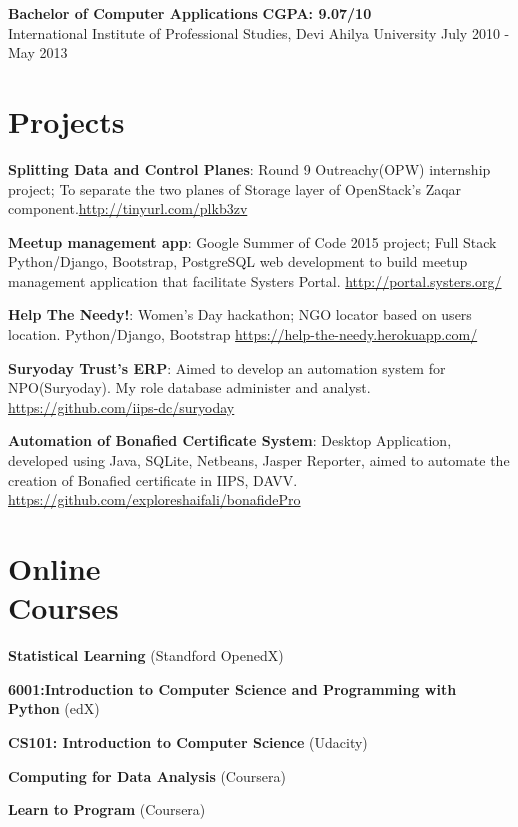 \documentclass[margin,line]{resume}
\begin{document}
\begin{resume}
	\begin{list2}
	\item \textbf{Bachelor of Computer Applications} \hspace{70mm} \textbf{CGPA: 9.07/10} \\ International Institute of Professional Studies, Devi Ahilya University \hspace{20mm} July 2010 - May 2013
	\end{list2}

    \section{\mysidestyle Projects} 
	\begin{list2}

    \item \textbf{Splitting Data and Control Planes}: Round 9 Outreachy(OPW) internship project; To separate the two planes of Storage layer of OpenStack's Zaqar component.\url{http://tinyurl.com/plkb3zv}
    \item \textbf{Meetup management app}: Google Summer of Code 2015 project; Full Stack Python/Django, Bootstrap, PostgreSQL web development to build meetup management application that facilitate Systers Portal. \url{http://portal.systers.org/}	
    \item \textbf{Help The Needy!}: Women's Day hackathon; NGO locator based on users location. Python/Django, Bootstrap \url{https://help-the-needy.herokuapp.com/}
	\item \textbf{Suryoday Trust's ERP}: Aimed to develop an automation system for NPO(Suryoday). My role
    database administer and analyst. \url{https://github.com/iips-dc/suryoday}
	\item \textbf{Automation of Bonafied Certificate System}: Desktop Application, developed using Java,
    SQLite, Netbeans, Jasper Reporter, aimed to automate the creation of Bonafied certificate in IIPS, DAVV. \url{https://github.com/exploreshaifali/bonafidePro}
    \end{list2}

    \section{\mysidestyle Online \\ Courses}

    \begin{list2}
	\item \textbf{Statistical Learning} (Standford OpenedX)
	\item \textbf{6001:Introduction to Computer Science and Programming with Python} (edX)
	\item \textbf{CS101: Introduction to Computer Science} (Udacity)
	\item \textbf{Computing for Data Analysis} (Coursera)
    \item \textbf{Learn to Program} (Coursera)
	\end{list2}


\end{resume}
\end{document}

